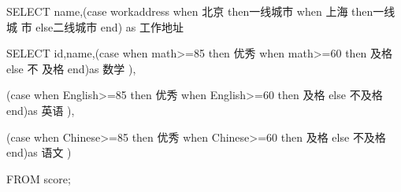 \documentclass[
  letterpaper,
  DIV=11,
  numbers=noendperiod]{scrreprt}
\newenvironment{Shaded}{\begin{snugshade}}{\end{snugshade}}
\newcommand{\ControlFlowTok}[1]{\textcolor[rgb]{0.00,0.23,0.31}{#1}}
\newcommand{\DecValTok}[1]{\textcolor[rgb]{0.68,0.00,0.00}{#1}}
\newcommand{\KeywordTok}[1]{\textcolor[rgb]{0.00,0.23,0.31}{#1}}
\newcommand{\NormalTok}[1]{\textcolor[rgb]{0.00,0.23,0.31}{#1}}
\newcommand{\OperatorTok}[1]{\textcolor[rgb]{0.37,0.37,0.37}{#1}}
\newcommand{\StringTok}[1]{\textcolor[rgb]{0.13,0.47,0.30}{#1}}
\begin{document}
\begin{Shaded}
\begin{Highlighting}[]
\KeywordTok{SELECT}\NormalTok{ name,(}\ControlFlowTok{case}\NormalTok{ workaddress }\ControlFlowTok{when} \StringTok{\textquotesingle{}北京 \textquotesingle{}}\NormalTok{then}\StringTok{\textquotesingle{}一线城市 \textquotesingle{}}\NormalTok{when }\StringTok{\textquotesingle{}上海 \textquotesingle{}}\NormalTok{then}\StringTok{\textquotesingle{}一线城 市 \textquotesingle{}}\NormalTok{else}\StringTok{\textquotesingle{}二线城市 \textquotesingle{}}\NormalTok{end) }\KeywordTok{as} \StringTok{\textquotesingle{}工作地址 \textquotesingle{}}

\KeywordTok{SELECT} \KeywordTok{id}\NormalTok{,name,(}\ControlFlowTok{case} \ControlFlowTok{when}\NormalTok{ math}\OperatorTok{\textgreater{}=}\DecValTok{85} \ControlFlowTok{then} \StringTok{\textquotesingle{}优秀 \textquotesingle{}} \ControlFlowTok{when}\NormalTok{ math}\OperatorTok{\textgreater{}=}\DecValTok{60} \ControlFlowTok{then} \StringTok{\textquotesingle{}及格 \textquotesingle{}}\NormalTok{else }\StringTok{\textquotesingle{}不 及格 \textquotesingle{}}\NormalTok{end)}\KeywordTok{as} \StringTok{\textquotesingle{}数学 \textquotesingle{}}\NormalTok{),}

\NormalTok{(}\ControlFlowTok{case} \ControlFlowTok{when}\NormalTok{ English}\OperatorTok{\textgreater{}=}\DecValTok{85} \ControlFlowTok{then} \StringTok{\textquotesingle{}优秀 \textquotesingle{}} \ControlFlowTok{when}\NormalTok{ English}\OperatorTok{\textgreater{}=}\DecValTok{60} \ControlFlowTok{then} \StringTok{\textquotesingle{}及格 \textquotesingle{}}\NormalTok{else }\StringTok{\textquotesingle{}不及格 \textquotesingle{}}\NormalTok{end)}\KeywordTok{as} \StringTok{\textquotesingle{}英语 \textquotesingle{}}\NormalTok{),}

\NormalTok{(}\ControlFlowTok{case} \ControlFlowTok{when}\NormalTok{ Chinese}\OperatorTok{\textgreater{}=}\DecValTok{85} \ControlFlowTok{then} \StringTok{\textquotesingle{}优秀 \textquotesingle{}} \ControlFlowTok{when}\NormalTok{ Chinese}\OperatorTok{\textgreater{}=}\DecValTok{60} \ControlFlowTok{then} \StringTok{\textquotesingle{}及格 \textquotesingle{}}\NormalTok{else }\StringTok{\textquotesingle{}不及格 \textquotesingle{}}\NormalTok{end)}\KeywordTok{as} \StringTok{\textquotesingle{}语文 \textquotesingle{}}\NormalTok{)}

\KeywordTok{FROM}\NormalTok{ score;}
\end{Highlighting}
\end{Shaded}
\end{document}
